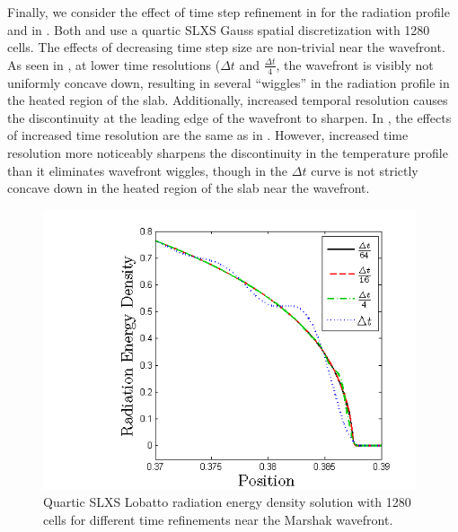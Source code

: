 Finally, we consider the effect of time step refinement in  for the radiation profile and in .
Both  and  use a quartic SLXS Gauss spatial discretization with 1280 cells.
The effects of decreasing time step size are non-trivial near the wavefront.
As seen in , at lower time resolutions ($\Delta t$ and $\frac{\Delta t}{4}$, the wavefront is visibly not uniformly concave down, resulting in several ``wiggles'' in the radiation profile in the heated region of the slab.
Additionally, increased temporal resolution causes the discontinuity at the leading edge of the wavefront to sharpen.
In , the effects of increased time resolution are the same as in .
However, increased time resolution more noticeably sharpens the discontinuity in the temperature profile than it eliminates wavefront wiggles, though in  the $\Delta t$ curve is not strictly concave down in the heated region of the slab near the wavefront.
%
%
\begin{figure}[!htp]
\centering
\includegraphics[width=11cm]{chapter6_grey_radtran/Dissertation_Data/Time_Refinement_Zoom_Radiation.png}
\caption{Quartic SLXS Lobatto radiation energy density solution with 1280 cells for different time refinements near the Marshak wavefront.}
\label{fig:time_refinement_rad}
\end{figure}
%
%
